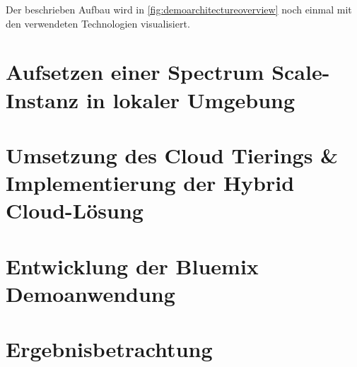 Der beschrieben Aufbau wird in \autoref{fig:demoarchitectureoverview} noch einmal mit den verwendeten Technologien visualisiert. 

\section{Aufsetzen einer Spectrum Scale-Instanz in lokaler Umgebung}


\section{Umsetzung des Cloud Tierings \& Implementierung der Hybrid Cloud-Lösung}


\section{Entwicklung der Bluemix Demoanwendung}\label{sec:application}


\section{Ergebnisbetrachtung}
